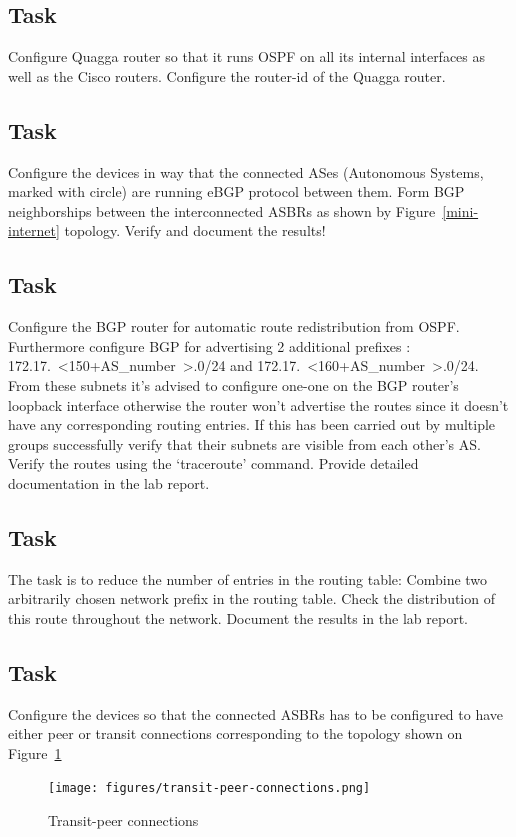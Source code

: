 \documentclass[a4paper]{article}
\begin{document}
\subsection{Task}
Configure Quagga router so that it runs OSPF on all its internal interfaces as well as the Cisco routers. Configure the router-id of the Quagga router.
\subsection{Task}
Configure the devices in way that the connected ASes (Autonomous Systems, marked with circle) are running eBGP protocol between them. Form BGP neighborships between the interconnected ASBRs as shown by Figure~\ref{mini-internet} topology.
Verify and document the results!
\subsection{Task}
Configure the BGP router for automatic route redistribution from OSPF. Furthermore configure BGP for advertising 2 additional prefixes : 172.17.~\textless150+AS\_number~\textgreater.0/24 and 172.17.~\textless160+AS\_number~\textgreater.0/24. From these subnets it's advised to configure one-one on the BGP router's loopback interface otherwise the router won't advertise the routes since it doesn't have any corresponding routing entries. If this has been carried out by multiple groups successfully verify that their subnets are visible from each other's AS. Verify the routes using the `traceroute' command. Provide detailed documentation in the lab report.
\subsection{Task}
The task is to reduce the number of entries in the routing table: Combine two arbitrarily chosen network prefix in the routing table. Check the distribution of this route throughout the network. Document the results in the lab report.
\subsection{Task}
Configure the devices so that the connected ASBRs has to be configured to have either peer or transit connections corresponding to the topology shown on Figure~\ref{fig:transit-connections}
\begin{figure}[H]
    \centering
    \texttt{[image: figures/transit-peer-connections.png]}
    \caption{Transit-peer connections}
    \label{fig:transit-connections}
\end{figure}
\end{document}
